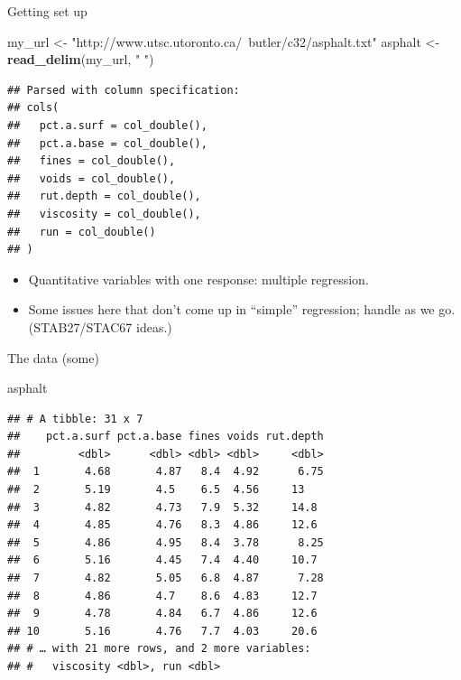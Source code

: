 \documentclass[ignorenonframetext,]{beamer}
\newenvironment{Shaded}{\begin{snugshade}}{\end{snugshade}}
\newcommand{\KeywordTok}[1]{\textcolor[rgb]{0.13,0.29,0.53}{\textbf{#1}}}
\newcommand{\NormalTok}[1]{#1}
\newcommand{\StringTok}[1]{\textcolor[rgb]{0.31,0.60,0.02}{#1}}
\providecommand{\tightlist}{%
  \setlength{\itemsep}{0pt}\setlength{\parskip}{0pt}}
\begin{document}
\begin{frame}[fragile]{Getting set up}
\protect\hypertarget{getting-set-up}{}

\begin{Shaded}
\begin{Highlighting}[]
\NormalTok{my_url <-}\StringTok{ "http://www.utsc.utoronto.ca/~butler/c32/asphalt.txt"}
\NormalTok{asphalt <-}\StringTok{ }\KeywordTok{read_delim}\NormalTok{(my_url, }\StringTok{" "}\NormalTok{)}
\end{Highlighting}
\end{Shaded}

\begin{verbatim}
## Parsed with column specification:
## cols(
##   pct.a.surf = col_double(),
##   pct.a.base = col_double(),
##   fines = col_double(),
##   voids = col_double(),
##   rut.depth = col_double(),
##   viscosity = col_double(),
##   run = col_double()
## )
\end{verbatim}

\begin{itemize}
\tightlist
\item
  Quantitative variables with one response: multiple regression.
\item
  Some issues here that don't come up in ``simple'' regression; handle
  as we go. (STAB27/STAC67 ideas.)
\end{itemize}

\end{frame}

\begin{frame}[fragile]{The data (some)}
\protect\hypertarget{the-data-some-4}{}

\begin{Shaded}
\begin{Highlighting}[]
\NormalTok{asphalt}
\end{Highlighting}
\end{Shaded}

\begin{verbatim}
## # A tibble: 31 x 7
##    pct.a.surf pct.a.base fines voids rut.depth
##         <dbl>      <dbl> <dbl> <dbl>     <dbl>
##  1       4.68       4.87   8.4  4.92      6.75
##  2       5.19       4.5    6.5  4.56     13   
##  3       4.82       4.73   7.9  5.32     14.8 
##  4       4.85       4.76   8.3  4.86     12.6 
##  5       4.86       4.95   8.4  3.78      8.25
##  6       5.16       4.45   7.4  4.40     10.7 
##  7       4.82       5.05   6.8  4.87      7.28
##  8       4.86       4.7    8.6  4.83     12.7 
##  9       4.78       4.84   6.7  4.86     12.6 
## 10       5.16       4.76   7.7  4.03     20.6 
## # … with 21 more rows, and 2 more variables:
## #   viscosity <dbl>, run <dbl>
\end{verbatim}

\end{frame}
\end{document}
